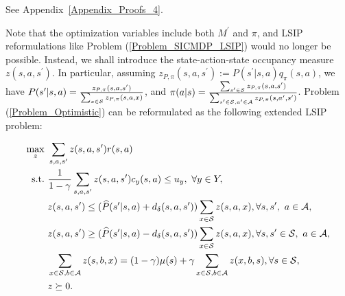 See Appendix~\ref{Appendix_Proofs_4}.
\endproof

Note that the optimization variables include both $M^\prime$ and $\pi$, and LSIP reformulations like Problem (\ref{Problem_SICMDP_LSIP}) would no longer be possible. 
Instead, we shall introduce the state-action-state occupancy measure $z(s,a,s^\prime)$.
In particular, assuming $z_{P,\pi}(s,a,s^\prime):=P(s^\prime|s,a)q_\pi(s,a)$, we have $P(s^\prime|s,a)=\frac{z_{P,\pi}(s,a,s^\prime)}{\sum_{x\in {\mathcal{S}}}z_{P,\pi}(s,a,x)}$, and $\pi(a|s)=\frac{\sum_{s^\prime\in {\mathcal{S}}}z_{P,\pi}(s,a,s^\prime)}{\sum_{s^\prime\in {\mathcal{S}},a^\prime\in {\mathcal{A}}}z_{P,\pi}(s,a^\prime,s^\prime)}$. 
Problem (\ref{Problem_Optimistic}) can be reformulated as the following extended LSIP problem:

\begingroup
\small
\begin{equation}\label{Problem_Optimistic_ELSIP}
\begin{aligned}
    \max_{z}\ &\sum_{s, a,s^\prime}z(s,a,s^\prime)r(s,a) \\
    \text{s.t.}\ &\frac{1}{1-\gamma}\sum_{s, a,s^\prime}z(s,a,s^\prime)c_y(s,a)\leq u_y,\ \forall y\in Y, \\
    &z(s,a,s^\prime)\leq (\widehat P(s^\prime|s,a)+d_\delta(s,a,s^\prime))\sum_{x\in {\mathcal{S}}} z(s,a,x), \forall s,s^\prime,\ a\in {\mathcal{A}}, \\
    &z(s,a,s^\prime)\geq (\widehat P(s^\prime|s,a)-d_\delta(s,a,s^\prime))\sum_{x\in {\mathcal{S}}} z(s,a,x), \forall s,s^\prime\in {\mathcal{S}},\ a\in {\mathcal{A}}, \\
    &\sum_{x\in {\mathcal{S}},b\in {\mathcal{A}}}z(s,b,x)=(1-\gamma)\mu(s)+\gamma\sum_{x\in {\mathcal{S}},b\in {\mathcal{A}}}z(x,b,s), \forall s\in {\mathcal{S}}, \\
    &z\succeq 0.
\end{aligned}
\end{equation}
\endgroup

